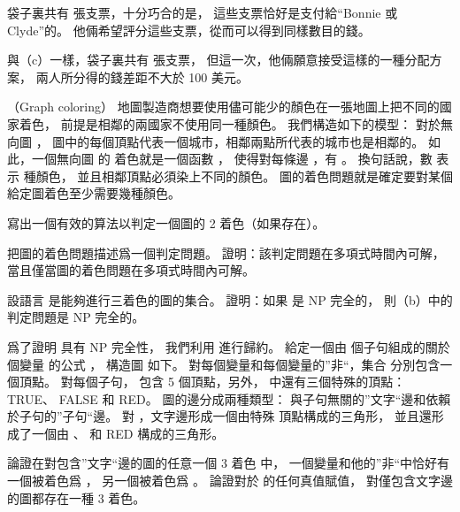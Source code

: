 \startigBase[continue]\startitem
袋子裏共有  張支票，十分巧合的是，
這些支票恰好是支付給“Bonnie 或 Clyde”的。
他倆希望評分這些支票，從而可以得到同樣數目的錢。
\stopitem\stopigBase

\startANSWER
{}
\stopANSWER

\startigBase[continue]\startitem
與（c）一樣，袋子裏共有  張支票，
但這一次，他倆願意接受這樣的一種分配方案，
兩人所分得的錢差距不大於 100 美元。
\stopitem\stopigBase

\startANSWER
{}
\stopANSWER
\stopPROBLEM

\startPROBLEM
（Graph coloring）
地圖製造商想要使用儘可能少的顏色在一張地圖上把不同的國家着色，
前提是相鄰的兩國家不使用同一種顏色。
我們構造如下的模型：
對於無向圖 ，
圖中的每個頂點代表一個城市，相鄰兩點所代表的城市也是相鄰的。
如此，一個無向圖  的{\EMP {} 着色}就是一個函數
 ，
使得對每條邊 ，有 。
換句話說，數  表示  種顏色，
並且相鄰頂點必須染上不同的顏色。
{\EMP 圖的着色}問題就是確定要對某個給定圖着色至少需要幾種顏色。

\startigBase[a]\startitem
寫出一個有效的算法以判定一個圖的 2 着色（如果存在）。
\stopitem\stopigBase

\startANSWER
{}
\stopANSWER

\startigBase[continue]\startitem
把圖的着色問題描述爲一個判定問題。
證明：該判定問題在多項式時間內可解，
當且僅當圖的着色問題在多項式時間內可解。
\stopitem\stopigBase

\startANSWER
{}
\stopANSWER

\startigBase[continue]\startitem
設語言  是能夠進行三着色的圖的集合。
證明：如果  是 NP 完全的，
則（b）中的判定問題是 NP 完全的。
\stopitem\stopigBase

\startANSWER
{}
\stopANSWER

爲了證明  具有 NP 完全性，
我們利用  進行歸約。
給定一個由  個子句組成的關於  個變量
  的公式 \m{\phi}，
構造圖  如下。
對每個變量和每個變量的”非“，集合  分別包含一個頂點。
對每個子句，  包含 5 個頂點，另外，
  中還有三個特殊的頂點：
 TRUE、 FALSE 和 RED。
圖的邊分成兩種類型：
與子句無關的”文字“邊和依賴於子句的”子句“邊。
對 ，文字邊形成一個由特殊
頂點構成的三角形，
並且還形成了一個由 、  和 RED 構成的三角形。

\startigBase[continue]\startitem
論證在對包含”文字“邊的圖的任意一個 3 着色  中，
一個變量和他的”非“中恰好有一個被着色爲 ，
另一個被着色爲 。
論證對於 \m{\phi} 的任何真值賦值，
對僅包含文字邊的圖都存在一種 3 着色。
\stopitem\stopigBase

